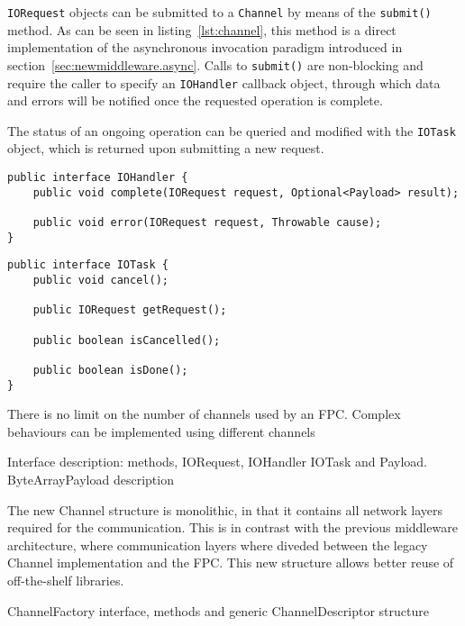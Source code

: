 \texttt{IORequest} objects can be submitted to a \texttt{Channel} by means of the \texttt{submit()} method. As can be seen in listing~\ref{lst:channel}, this method is a direct implementation of the asynchronous invocation paradigm introduced in section~\ref{sec:newmiddleware.async}. Calls to \texttt{submit()} are non-blocking and require the caller to specify an \texttt{IOHandler} callback object, through which data and errors will be notified once the requested operation is complete.

The status of an ongoing operation can be queried and modified with the \texttt{IOTask} object, which is returned upon submitting a new request.


\lstset{language=Java}
\begin{lstlisting}[float,floatplacement=H,caption=The IOHandler interface,label={lst:iohandler}]
public interface IOHandler {
	public void complete(IORequest request, Optional<Payload> result);
	
	public void error(IORequest request, Throwable cause);
}
\end{lstlisting}

\lstset{language=Java}
\begin{lstlisting}[float,floatplacement=H,caption=The IOTask interface,label={lst:iotask}]
public interface IOTask {
	public void cancel();
	
	public IORequest getRequest();
	
	public boolean isCancelled();
	
	public boolean isDone();
}
\end{lstlisting}







There is no limit on the number of channels used by an FPC. Complex behaviours can be implemented using different channels

Interface description: methods, IORequest, IOHandler IOTask and Payload.
ByteArrayPayload description

The new Channel structure is monolithic, in that it contains all network layers required for the communication. This is in contrast with the previous middleware architecture, where communication layers where diveded between the legacy Channel implementation and the FPC. This new structure allows better reuse of off-the-shelf libraries.

ChannelFactory interface, methods and generic ChannelDescriptor structure

